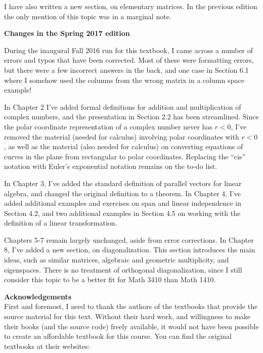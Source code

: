 I have also written a new section, on elementary matrices. In the previous edition the only mention of this topic was in a marginal note.

\bigskip

\noindent\textbf{\large Changes in the Spring 2017 edition}

During the inaugural Fall 2016 run for this textbook, I came across a number of errors and typos that have been corrected. Most of these were formatting errors, but there were a few incorrect answers in the back, and one case in Section 6.1 where I somehow used the columns from the wrong matrix in a column space example!

In Chapter 2 I've added formal definitions for addition and multiplication of complex numbers, and the presentation in Section 2.2 has been streamlined. Since the polar coordinate representation of a complex number never has $r<0$, I've removed the material (needed for calculus) involving polar coordinates with $r<0$, as well as the material (also needed for calculus) on converting equations of curves in the plane from rectangular to polar coordinates. Replacing the ``cis'' notation with Euler's exponential notation remains on the to-do list.

In Chapter 3, I've added the standard definition of parallel vectors for linear algebra, and changed the original definition to a theorem. In Chapter 4, I've added additional examples and exercises on span and linear independence in Section 4.2, and two additional examples in Section 4.5 on working with the definition of a linear transformation.

Chapters 5-7 remain largely unchanged, aside from error corrections. In Chapter 8, I've added a new section, on diagonalization. This section introduces the main ideas, such as similar matrices, algebraic and geometric multiplicity, and eigenspaces. There is no treatment of orthogonal diagonalization, since I still consider this topic to be a better fit for Math 3410 than Math 1410.

\pagebreak


\noindent\textbf{\large Acknowledgements}\\

First and foremost, I need to thank the authors of the textbooks that provide the source material for this text. Without their hard work, and willingness to make their books (and the source code) freely available, it would not have been possible to create an affordable textbook for this course. You can find the original textbooks at their websites:

